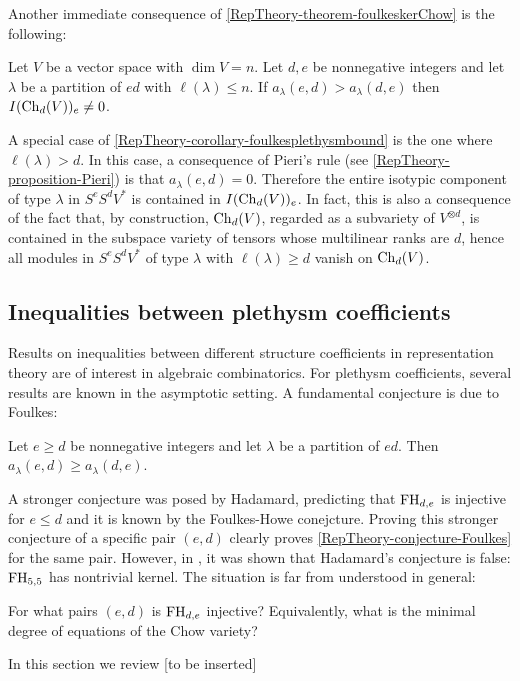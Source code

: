 Another immediate consequence of \ref{RepTheory-theorem-foulkeskerChow} is the following:
\begin{corollary}
\label{RepTheory-corollary-foulkesplethysmbound}
Let $V$ be a vector space with $\dim V =n$. Let $d,e$ be nonnegative integers and let $\lambda$ be a partition of $ed$ with $\ell(\lambda) \leq n$. If $a_\lambda(e,d) > a_\lambda(d,e)$ then $I(\mathrm{Ch}_d(V))_e \neq 0$.
\end{corollary}
A special case of \ref{RepTheory-corollary-foulkesplethysmbound} is the one where $\ell(\lambda) > d$. In this case, a consequence of Pieri's rule (see \ref{RepTheory-proposition-Pieri}) is that $a_\lambda(e,d) = 0$. Therefore the entire isotypic component of type $\lambda$ in $S^e S^d V^*$ is contained in $I(\mathrm{Ch}_d(V))_e$. In fact, this is also a consequence of the fact that, by construction, $\mathrm{Ch}_d(V)$, regarded as a subvariety of $V^{\otimes d}$, is contained in the subspace variety of tensors whose multilinear ranks are $d$, hence all modules in $S^eS^d V^*$ of type $\lambda$ with $\ell(\lambda) \geq d$ vanish on $\mathrm{Ch}_d(V)$.

\subsection{Inequalities between plethysm coefficients}

Results on inequalities between different structure coefficients in representation theory are of interest in algebraic combinatorics. For plethysm coefficients, several results are known in the asymptotic setting. A fundamental conjecture is due to Foulkes:
\begin{conjecture}
 \label{RepTheory-conjecture-Foulkes}
 Let $e \geq d$ be nonnegative integers and let $\lambda$ be a partition of $ed$. Then $a_\lambda (e,d) \geq a_\lambda(d,e)$.
\end{conjecture}
A stronger conjecture was posed by Hadamard, predicting that $\mathrm{FH}_{d,e}$ is injective for $e \leq d$ and it is known by the Foulkes-Howe conejcture. Proving this stronger conjecture of a specific pair $(e,d)$ clearly proves \ref{RepTheory-conjecture-Foulkes} for the same pair. However, in \cite{MN05}, it was shown that Hadamard's conjecture is false: $\mathrm{FH}_{5,5}$ has nontrivial kernel. The situation is far from understood in general:
\begin{question}
 \label{RepTheory-question-whenfoulkesmap}
For what pairs $(e,d)$ is $\mathrm{FH}_{d,e}$ injective? Equivalently, what is the minimal degree of equations of the Chow variety?
\end{question}
In this section we review [to be inserted]

